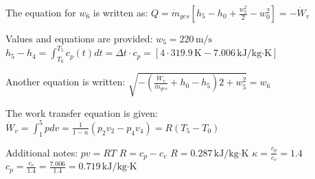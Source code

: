The equation for \( w_6 \) is written as:  
\( Q = \dot{m}_{ges} \left[ h_5 - h_0 + \frac{w_5^2}{2} - w_0^2 \right] = -\dot{W}_v \)  

Values and equations are provided:  
\( w_5 = 220 \, \text{m/s} \)  
\( h_5 - h_4 = \int_{T_0}^{T_5} c_p(t) dt = \Delta t \cdot c_p = [4 \cdot 319.9 \, \text{K} - 7.006 \, \text{kJ/kg·K}] \)  

Another equation is written:  
\( \sqrt{-\left( \frac{\dot{W}_v}{\dot{m}_{ges}} + h_0 - h_5 \right) 2 + w_5^2} = w_6 \)  

The work transfer equation is given:  
\( \dot{W}_v = \int_1^5 p dv = \frac{1}{1-n} \left( p_2 v_2 - p_4 v_4 \right) = R \left( T_5 - T_0 \right) \)  

Additional notes:  
\( p v = RT \)  
\( R = c_p - c_v \)  
\( R = 0.287 \, \text{kJ/kg·K} \)  
\( \kappa = \frac{c_p}{c_v} = 1.4 \)  
\( c_p = \frac{c_v}{1.4} = \frac{7.006}{1.4} = 0.719 \, \text{kJ/kg·K} \)